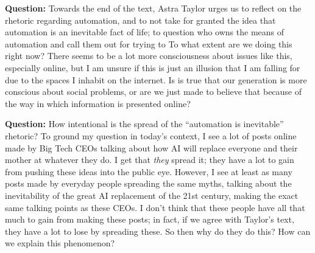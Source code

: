
\textbf{Question:} 
Towards the end of the text, Astra Taylor urges us to reflect on the rhetoric regarding automation, and to not take for granted the idea that automation is an inevitable fact of life; to question who owns the means of automation and call them out for trying to 
To what extent are we doing this right now?
There seems to be a lot more consciousness about issues like this, especially online, but I am unsure if this is just an illusion that I am falling for due to the spaces I inhabit on the internet.
Is is true that our generation is more conscious about social problems, or are we just made to believe that because of the way in which information is presented online?

\textbf{Question:}
How intentional is the spread of the ``automation is inevitable'' rhetoric?
To ground my question in today's context, I see a lot of posts online made by Big Tech CEOs talking about how AI will replace everyone and their mother at whatever they do.
I get that \textit{they} spread it; they have a lot to gain from pushing these ideas into the public eye.
However, I see at least as many posts made by everyday people spreading the same myths, talking about the inevitability of the great AI replacement of the 21st century, making the exact same talking points as these CEOs.
I don't think that these people have all that much to gain from making these posts; in fact, if we agree with Taylor's text, they have a lot to lose by spreading these.
So then why do they do this?
How can we explain this phenomenon?